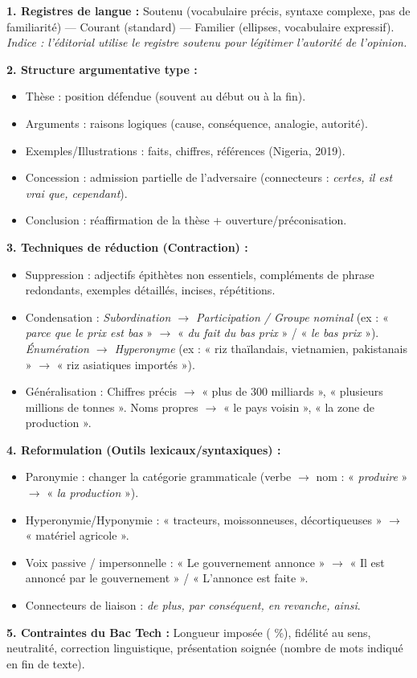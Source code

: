 \documentclass[11pt]{article}
\newcommand{\cle}[1]{{\popxbold\color{popdark}#1}}
\newcounter{popsec}
\newcounter{popsub}
\newcommand{\courssub}[1]{%
  \stepcounter{popsub}%
  \par\vspace{9pt}\noindent{\popxbold\fontsize{11.5}{13}\selectfont\color{popink}{\color{poporange}\thepopsec.\thepopsub}\hspace{6pt}#1}\par\nopagebreak\vspace{4pt}
}
\begin{document}
\courssub{Ressources à mobiliser}
\begin{aretenir}
\textbf{1. Registres de langue :} Soutenu (vocabulaire précis, syntaxe complexe, pas de familiarité) — Courant (standard) — Familier (ellipses, vocabulaire expressif). \textit{Indice : l'éditorial utilise le registre soutenu pour légitimer l'autorité de l'opinion.}

\textbf{2. Structure argumentative type :}
\begin{itemize}
    \item \cle{Thèse} : position défendue (souvent au début ou à la fin).
    \item \cle{Arguments} : raisons logiques (cause, conséquence, analogie, autorité).
    \item \cle{Exemples/Illustrations} : faits, chiffres, références (Nigeria, 2019).
    \item \cle{Concession} : admission partielle de l'adversaire (connecteurs : \emph{certes, il est vrai que, cependant}).
    \item \cle{Conclusion} : réaffirmation de la thèse + ouverture/préconisation.
\end{itemize}

\textbf{3. Techniques de réduction (Contraction) :}
\begin{itemize}
    \item \cle{Suppression} : adjectifs épithètes non essentiels, compléments de phrase redondants, exemples détaillés, incises, répétitions.
    \item \cle{Condensation} : \emph{Subordination $\to$ Participation / Groupe nominal} (ex : « \emph{parce que le prix est bas} » $\to$ « \emph{du fait du bas prix} » / « \emph{le bas prix} »). \emph{Énumération $\to$ Hyperonyme} (ex : « riz thaïlandais, vietnamien, pakistanais » $\to$ « riz asiatiques importés »).
    \item \cle{Généralisation} : Chiffres précis $\to$ « plus de 300 milliards », « plusieurs millions de tonnes ». Noms propres $\to$ « le pays voisin », « la zone de production ».
\end{itemize}

\textbf{4. Reformulation (Outils lexicaux/syntaxiques) :}
\begin{itemize}
    \item \cle{Paronymie} : changer la catégorie grammaticale (verbe $\to$ nom : « \emph{produire} » $\to$ « \emph{la production} »).
    \item \cle{Hyperonymie/Hyponymie} : « tracteurs, moissonneuses, décortiqueuses » $\to$ « matériel agricole ».
    \item \cle{Voix passive / impersonnelle} : « Le gouvernement annonce » $\to$ « Il est annoncé par le gouvernement » / « L'annonce est faite ».
    \item \cle{Connecteurs de liaison} : \emph{de plus, par conséquent, en revanche, ainsi}.
\end{itemize}

\textbf{5. Contraintes du Bac Tech :} Longueur imposée ( \%), fidélité au sens, neutralité, correction linguistique, présentation soignée (nombre de mots indiqué en fin de texte).
\end{aretenir}
\end{document}
